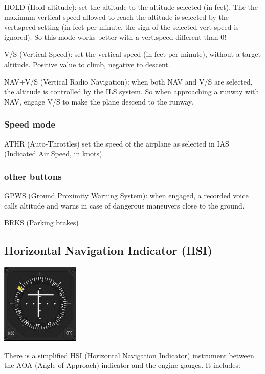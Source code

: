 HOLD (Hold altitude): set the altitude to the altitude selected (in
feet). The the maximum vertical speed allowed to reach the altitude is
selected by the vert.speed setting (in feet per minute, the sign of the
selected vert speed is ignored). So this mode works better with a
vert.speed different than 0!

V/S (Vertical Speed): set the vertical speed (in feet per minute),
without a target altitude. Positive value to climb, negative to descent.

NAV+V/S (Vertical Radio Navigation): when both NAV and V/S are selected,
the altitude is controlled by the ILS system. So when approaching a
runway with NAV, engage V/S to make the plane descend to the runway.

\hypertarget{speed-mode}{%
\subsubsection{Speed mode}\label{speed-mode}}

ATHR (Auto-Throttles) set the speed of the airplane as selected in IAS
(Indicated Air Speed, in knots).

\hypertarget{other-buttons}{%
\subsubsection{other buttons}\label{other-buttons}}

GPWS (Ground Proximity Warning System): when engaged, a recorded voice
calls altitude and warns in case of dangerous maneuvers close to the
ground.

BRKS (Parking brakes)

\hypertarget{horizontal-navigation-indicator-hsi}{%
\subsection{Horizontal Navigation Indicator
(HSI)}\label{horizontal-navigation-indicator-hsi}}

\includegraphics{images/autopilot-hsi.jpg}

There is a simplified HSI (Horizontal Navigation Indicator) instrument
between the AOA (Angle of Approach) indicator and the engine gauges. It
includes:

